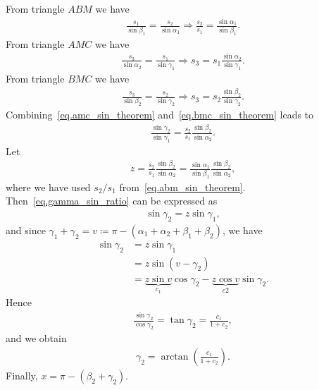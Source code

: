 \documentclass[12pt,a4paper]{article}
\begin{document}
From triangle $ABM$ we have
\begin{align} \label{eq.abm_sin_theorem}
  \frac{s_1}{\sin \beta_1} = \frac{s_2}{\sin \alpha_1} \Rightarrow \frac{s_2}{s_1} = \frac{\sin\alpha_1}{\sin\beta_1}.
\end{align}
%
From triangle $AMC$ we have
\begin{align} \label{eq.amc_sin_theorem}
  \frac{s_3}{\sin \alpha_2} = \frac{s_1}{\sin \gamma_1} \Rightarrow s_3 = s_1\frac{\sin\alpha_2}{\sin\gamma_1}.
\end{align}
%
From triangle $BMC$ we have
\begin{align} \label{eq.bmc_sin_theorem}
  \frac{s_3}{\sin \beta_2} = \frac{s_2}{\sin \gamma_2} \Rightarrow s_3 = s_2\frac{\sin\beta_2}{\sin\gamma_2}.
\end{align}
%
Combining~\eqref{eq.amc_sin_theorem} and~\eqref{eq.bmc_sin_theorem} leads to
\begin{align} \label{eq.gamma_sin_ratio}
  \frac{\sin\gamma_2}{\sin \gamma_1} = \frac{s_2}{s_1} \frac{\sin\beta_2}{\sin\alpha_2}.
\end{align}
%
Let
%
\begin{align*}
  z = \frac{s_2}{s_1} \frac{\sin\beta_2}{\sin\alpha_2} = \frac{\sin\alpha_1}{\sin\beta_1} \frac{\sin\beta_2}{\sin\alpha_2},
\end{align*}
where we have used $s_2/s_1$ from~\eqref{eq.abm_sin_theorem}. Then~\eqref{eq.gamma_sin_ratio} can be expressed as
\begin{align}
  \sin\gamma_2 = z \sin \gamma_1,
\end{align}
%
and since $\gamma_1 + \gamma_2 = v \coloneqq \pi - (\alpha_1 + \alpha_2 + \beta_1 + \beta_2)$, we have
\begin{align}
  \sin\gamma_2 &= z \sin \gamma_1 \\
  &= z\sin(v - \gamma_2)\\
  &= \underbrace{z\sin v}_{c_1} \cos\gamma_2 - \underbrace{z\cos v}_{c2} \sin\gamma_2.
\end{align}
%
Hence
%
\begin{align}
  \frac{\sin \gamma_2}{\cos \gamma_2} = \tan \gamma_2 = \frac{c_1}{1 + c_2},
\end{align}
%
and we obtain
%
\begin{align}
  \gamma_2 = \arctan\left(\frac{c_1}{1 + c_2}\right).
\end{align}
%
Finally, $x = \pi - (\beta_2 + \gamma_2)$.

\nocite{*}


\end{document}
